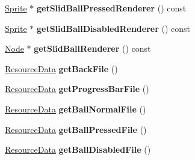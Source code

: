 \begin{DoxyCompactItemize}
\hyperlink{classSprite}{Sprite} $\ast$ {\bfseries get\+Slid\+Ball\+Pressed\+Renderer} () const
\item 
\mbox{\label{classui_1_1Slider_a7b3e0c15caf414979f461491d0eac1aa}} 
\hyperlink{classSprite}{Sprite} $\ast$ {\bfseries get\+Slid\+Ball\+Disabled\+Renderer} () const
\item 
\mbox{\label{classui_1_1Slider_af6d33b8c01ec28f0859a5011d27d57d5}} 
\hyperlink{classNode}{Node} $\ast$ {\bfseries get\+Slid\+Ball\+Renderer} () const
\item 
\mbox{\label{classui_1_1Slider_a4899554a3633b9c1a787f8cd2f6bdbb0}} 
\hyperlink{structResourceData}{Resource\+Data} {\bfseries get\+Back\+File} ()
\item 
\mbox{\label{classui_1_1Slider_a1fdb80936ca776de8b4495f1548b667f}} 
\hyperlink{structResourceData}{Resource\+Data} {\bfseries get\+Progress\+Bar\+File} ()
\item 
\mbox{\label{classui_1_1Slider_a154ae03327b5f3950bc426444a6597f7}} 
\hyperlink{structResourceData}{Resource\+Data} {\bfseries get\+Ball\+Normal\+File} ()
\item 
\mbox{\label{classui_1_1Slider_aea0d8623383344a046e001127929dbc8}} 
\hyperlink{structResourceData}{Resource\+Data} {\bfseries get\+Ball\+Pressed\+File} ()
\item 
\mbox{\label{classui_1_1Slider_a4aec4902fc6ca4a51b9af831dbb310de}} 
\hyperlink{structResourceData}{Resource\+Data} {\bfseries get\+Ball\+Disabled\+File} ()
\end{DoxyCompactItemize}
